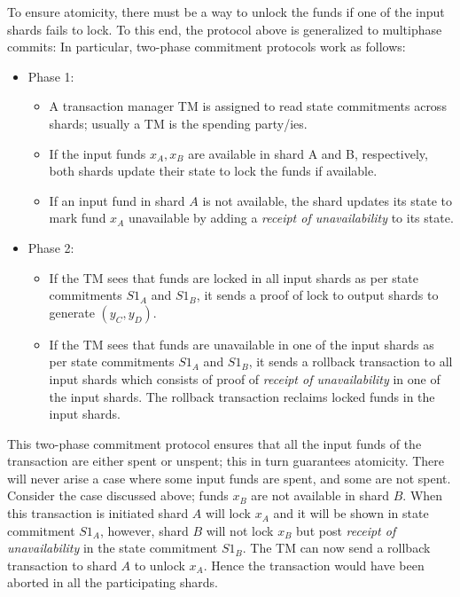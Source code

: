 \documentclass{article}
\begin{document}
To ensure atomicity, there must be a way to unlock the funds if one of the input shards fails to lock. To this end, the protocol above is generalized to multiphase commits: In particular,  two-phase commitment protocols work as follows:
\begin{itemize}
    \item Phase 1:
    \begin{itemize}
        \item A transaction manager TM is assigned to read state commitments across shards; usually a TM is the spending party/ies.
        \item If the input funds $x_A,x_B$ are available in shard A and B, respectively, both shards update their state to lock the funds if available. %
        \item If an input fund in shard $A$ is not available, the shard updates its state to mark fund $x_A$ unavailable by adding a {\em receipt of unavailability} to its state.  %
    \end{itemize}
    \item Phase 2:
    \begin{itemize}
        \item If the TM sees that funds are locked in all input shards as per state commitments $S1_A$ and $S1_B$, it sends a proof of lock to output shards to generate $(y_C,y_D)$.  %
        \item If the TM sees that funds are unavailable in one of the input shards as per state commitments $S1_A$ and $S1_B$, it sends a rollback transaction to all input shards which consists of proof of {\em receipt of unavailability} in one of the input shards. The rollback transaction reclaims locked funds in the input shards. 
    \end{itemize}
\end{itemize}

This two-phase commitment protocol ensures that all the input funds of the transaction are either spent or unspent; this in turn guarantees atomicity. There will never arise a case where some input funds are spent, and some are not spent. Consider the case discussed above; funds $x_B$ are not available in shard $B$. When this transaction is initiated shard $A$ will lock $x_A$ and it will be shown in state commitment $S1_A$, however, shard $B$ will not lock $x_B$ but post {\em receipt of unavailability} in the state commitment $S1_B$. The TM can now send a rollback transaction to shard $A$ to unlock $x_A$. Hence the transaction would have been aborted in all the participating shards.
\end{document}
